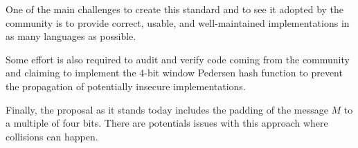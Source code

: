 One of the main challenges to create this standard and to see it adopted by the community is
to provide correct, usable, and well-maintained implementations in as many languages as possible.

Some effort is also required to audit and verify code coming from the community
and claiming to implement the 4-bit window Pedersen hash function
to prevent the propagation of potentially insecure implementations.

Finally, the proposal as it stands today includes the padding of the message $M$ to a multiple of four bits.
There are potentials issues with this approach where collisions can happen.



